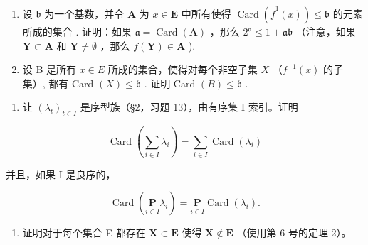 \begin{enumerate}
\def\labelenumi{(\alph{enumi})}
\item
  设 \(\mathfrak{b}\) 为一个基数，并令 \(\mathbf{A}\) 为 \(x \in \mathbf{E}\) 中所有使得 \(\operatorname{Card}(\overline{f}^1(x)) \leqslant \mathfrak{b}\) 的元素所成的集合 . 证明：如果 \(\mathfrak{a} = \operatorname{Card}(\mathbf{A})\) ，那么 \(2^{\mathfrak{a}} \leqslant 1 + \mathfrak{a}\mathfrak{b}\) （注意，如果 \(\mathbf{Y} \subset \mathbf{A}\) 和 \(\mathbf{Y} \neq \emptyset\) ，那么 \(f(\mathbf{Y}) \in \mathbf{A}\) ).
\item
  设 B 是所有 \(x \in E\) 所成的集合，使得对每个非空子集 \(X\) （\(f^{-1}(x)\) 的子集）, 都有 Card \((X) \leqslant \mathfrak{b}\) . 证明 Card \((B) \leqslant \mathfrak{b}\) .
\end{enumerate}

\begin{enumerate}
\def\labelenumi{\arabic{enumi}.}
\setcounter{enumi}{4}
\tightlist
\item
  让 \((\lambda_{t})_{t\in I}\) 是序型族（§2，习题 13），由有序集 I 索引。证明
\end{enumerate}

\[
\operatorname{Card} \left(\sum_ {i \in I} \lambda_ {i}\right) = \sum_ {i \in I} \operatorname{Card} \left(\lambda_ {i}\right)
\]

并且，如果 I 是良序的，

\[
\operatorname{Card} \left(\underset {i \in I} {\mathbf {P}} \lambda_ {i}\right) = \underset {i \in I} {\mathbf {P}} \operatorname{Card} \left(\lambda_ {i}\right).
\]

\begin{enumerate}
\def\labelenumi{\arabic{enumi}.}
\setcounter{enumi}{5}
\tightlist
\item
  证明对于每个集合 E 都存在 \(\mathbf{X} \subset \mathbf{E}\) 使得 \(\mathbf{X} \notin \mathbf{E}\) （使用第 6 号的定理 2）。
\end{enumerate}

